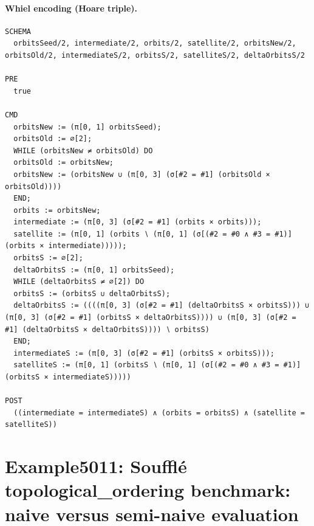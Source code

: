 \documentclass[10pt]{article}
\begin{document}
\paragraph{Whiel encoding (Hoare triple).}

\begin{Verbatim}[fontsize=\scriptsize,breaklines=true,breakanywhere=true,frame=single,framesep=1.5mm]
SCHEMA
  orbitsSeed/2, intermediate/2, orbits/2, satellite/2, orbitsNew/2, orbitsOld/2, intermediateS/2, orbitsS/2, satelliteS/2, deltaOrbitsS/2

PRE
  true 

CMD
  orbitsNew := (π[0, 1] orbitsSeed);
  orbitsOld := ∅[2];
  WHILE (orbitsNew ≠ orbitsOld) DO
  orbitsOld := orbitsNew;
  orbitsNew := (orbitsNew ∪ (π[0, 3] (σ[#2 = #1] (orbitsOld × orbitsOld))))
  END;
  orbits := orbitsNew;
  intermediate := (π[0, 3] (σ[#2 = #1] (orbits × orbits)));
  satellite := (π[0, 1] (orbits ∖ (π[0, 1] (σ[(#2 = #0 ∧ #3 = #1)] (orbits × intermediate)))));
  orbitsS := ∅[2];
  deltaOrbitsS := (π[0, 1] orbitsSeed);
  WHILE (deltaOrbitsS ≠ ∅[2]) DO
  orbitsS := (orbitsS ∪ deltaOrbitsS);
  deltaOrbitsS := ((((π[0, 3] (σ[#2 = #1] (deltaOrbitsS × orbitsS))) ∪ (π[0, 3] (σ[#2 = #1] (orbitsS × deltaOrbitsS)))) ∪ (π[0, 3] (σ[#2 = #1] (deltaOrbitsS × deltaOrbitsS)))) ∖ orbitsS)
  END;
  intermediateS := (π[0, 3] (σ[#2 = #1] (orbitsS × orbitsS)));
  satelliteS := (π[0, 1] (orbitsS ∖ (π[0, 1] (σ[(#2 = #0 ∧ #3 = #1)] (orbitsS × intermediateS)))))

POST
  ((intermediate = intermediateS) ∧ (orbits = orbitsS) ∧ (satellite = satelliteS))
\end{Verbatim}

\Needspace{0.45\textheight}

\section{Example5011: Soufflé topological\_ordering benchmark: naive versus semi-naive evaluation}\label{case:Example5011}
\end{document}
